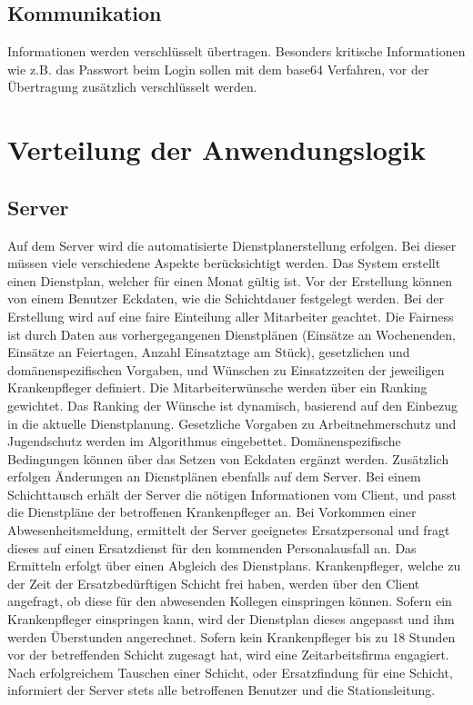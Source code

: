 \documentclass[11pt,
paper=a4,
bibtotocnumbered,	  %
liststotocnumbered,  %
DIV=calc,		  %
tablecaptionabove,	  %
headinclude,
]{article}
\begin{document}
\subsection{Kommunikation}
Informationen werden verschlüsselt übertragen. Besonders kritische Informationen wie z.B. das Passwort beim Login sollen mit dem base64 Verfahren, vor der Übertragung zusätzlich verschlüsselt werden.
\section{Verteilung der Anwendungslogik}
\subsection{Server}
Auf dem Server wird die automatisierte Dienstplanerstellung erfolgen. Bei dieser müssen viele verschiedene Aspekte berücksichtigt werden. Das System erstellt einen Dienstplan, welcher für einen Monat gültig ist. Vor der Erstellung können von einem Benutzer Eckdaten, wie die Schichtdauer festgelegt werden. Bei der Erstellung wird auf eine faire Einteilung aller Mitarbeiter geachtet. Die Fairness ist durch Daten aus vorhergegangenen Dienstplänen (Einsätze an Wochenenden, Einsätze an Feiertagen, Anzahl Einsatztage am Stück), gesetzlichen und domänenspezifischen Vorgaben, und Wünschen zu Einsatzzeiten der jeweiligen Krankenpfleger definiert. Die Mitarbeiterwünsche werden über ein Ranking gewichtet. Das Ranking der Wünsche ist dynamisch, basierend auf den Einbezug in die aktuelle Dienstplanung. Gesetzliche Vorgaben zu Arbeitnehmerschutz und Jugendschutz werden im Algorithmus eingebettet. Domänenspezifische Bedingungen können über das Setzen von Eckdaten ergänzt werden. Zusätzlich erfolgen Änderungen an Dienstplänen ebenfalls auf dem Server. Bei einem Schichttausch erhält der Server die nötigen Informationen vom Client, und passt die Dienstpläne der betroffenen Krankenpfleger an. Bei Vorkommen einer Abwesenheitsmeldung, ermittelt der Server geeignetes Ersatzpersonal und fragt dieses auf einen Ersatzdienst für den kommenden Personalausfall an. Das Ermitteln erfolgt über einen Abgleich des Dienstplans. Krankenpfleger, welche zu der Zeit der Ersatzbedürftigen Schicht frei haben, werden über den Client angefragt, ob diese für den abwesenden Kollegen einspringen können. Sofern ein Krankenpfleger einspringen kann, wird der Dienstplan dieses angepasst und ihm werden Überstunden angerechnet. Sofern kein Krankenpfleger bis zu 18 Stunden vor der betreffenden Schicht zugesagt hat, wird eine Zeitarbeitsfirma engagiert. Nach erfolgreichem Tauschen einer Schicht, oder Ersatzfindung für eine Schicht, informiert der Server stets alle betroffenen Benutzer und die Stationsleitung.
\end{document}
